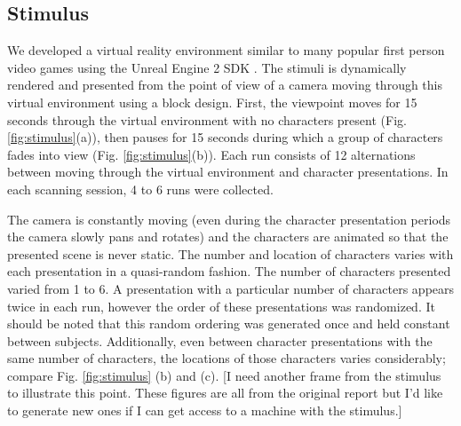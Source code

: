 \documentclass[final]{article}
\begin{document}
\subsection{Stimulus}
We developed a virtual reality environment similar to many popular first person video games using the Unreal Engine 2 SDK \cite{UnrealEngine2}.
The stimuli is dynamically rendered and presented from the point of view of a camera moving through this 
virtual environment using a block design. First, the viewpoint moves for 15 seconds through the virtual 
environment with no characters present (Fig. \ref{fig:stimulus}(a)), then pauses for 15 seconds during 
which a group of characters fades into view (Fig. \ref{fig:stimulus}(b)). Each run consists of 12 
alternations between moving through the virtual environment and character presentations. 
In each scanning session, 4 to 6 runs were collected.

The camera is constantly moving (even during the character presentation periods the camera slowly pans and rotates) and the characters are animated so that the presented scene is never static.
The number and location of characters varies with each presentation in a quasi-random fashion.
The number of characters presented varied from 1 to 6.
A presentation with a particular number of characters appears twice in each run, however the order of these presentations was randomized.
It should be noted that this random ordering was generated once and held constant between subjects.
Additionally, even between character presentations with the same number of characters, the locations of those characters varies considerably; compare Fig. \ref{fig:stimulus} (b) and (c).
[I need another frame from the stimulus to illustrate this point. These figures are all from the original report but I'd like to generate new ones if I can get access to a machine with the stimulus.]
\end{document}
